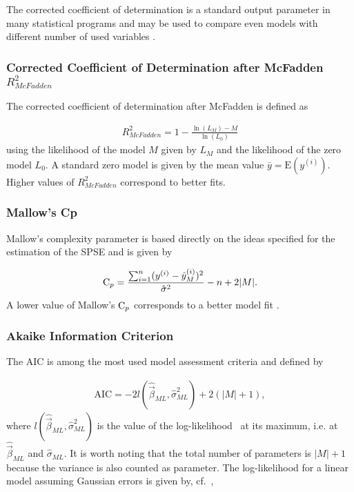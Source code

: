 The corrected coefficient of determination is a standard output parameter in many statistical programs and may be used to compare even models with different number of used variables \cite{fahrmeir2007regression}.

\subsubsection{Corrected Coefficient of Determination after McFadden $R_{McFadden}^2$}

The corrected coefficient of determination after McFadden is defined as

\begin{align}
	R_{McFadden}^2 = 1 - \frac{\ln{(L_M)} - M}{\ln{(L_0)}}
\end{align}
%
using the likelihood of the model $M$ given by $L_M$ and the likelihood of the zero model $L_0$. A standard zero model is given by the mean value $\bar y = \text{E}(y^{(i)})$. Higher values of $R_{McFadden}^2$ correspond to better fits.

\subsubsection{Mallow's Cp}

Mallow's complexity parameter is based directly on the ideas specified for the estimation of the SPSE and is given by

\begin{align}
	\text C_p = \frac{\sum_{i=1}^n (y^{(i)} - \hat y^{(i)}_M)^2}{\hat \sigma^2} - n + 2 \vert M \vert.
\end{align}
%
A lower value of Mallow's $\text C_p$ corresponds to a better model fit \cite{fahrmeir2007regression}.

\subsubsection{Akaike Information Criterion}

The AIC is among the most used model assessment criteria and defined by

\begin{align}
	\text{AIC} = -2 l(\hat{\vec{\beta}}_{ML}, \hat \sigma^2_{ML}) + 2(\vert M \vert +1),
\end{align}
%
where $l(\hat{\vec{\beta}}_{ML}, \hat \sigma^2_{ML})$ is the value of the log-likelihood~ at its maximum, i.e. at $\hat{\vec{\beta}}_{ML}$ and $\hat{\sigma}_{ML}$. It is worth noting that the total number of parameters is $\vert M \vert + 1$ because the variance is also counted as parameter. The log-likelihood for a linear model assuming Gaussian errors is given by, cf.~,

